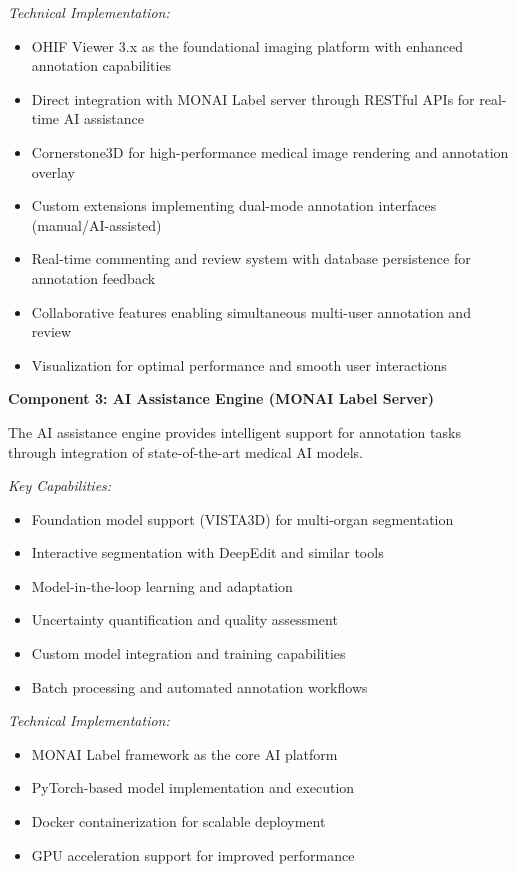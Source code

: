 \textit{Technical Implementation:}
\begin{itemize}
    \item OHIF Viewer 3.x as the foundational imaging platform with enhanced annotation capabilities
    \item Direct integration with MONAI Label server through RESTful APIs for real-time AI assistance
    \item Cornerstone3D for high-performance medical image rendering and annotation overlay
    \item Custom extensions implementing dual-mode annotation interfaces (manual/AI-assisted)
    \item Real-time commenting and review system with database persistence for annotation feedback
    \item Collaborative features enabling simultaneous multi-user annotation and review
    \item Visualization for optimal performance and smooth user interactions
\end{itemize}

\textbf{Component 3: AI Assistance Engine (MONAI Label Server)}

The AI assistance engine provides intelligent support for annotation tasks through integration of state-of-the-art medical AI models.

\textit{Key Capabilities:}
\begin{itemize}
    \item Foundation model support (VISTA3D) for multi-organ segmentation
    \item Interactive segmentation with DeepEdit and similar tools
    \item Model-in-the-loop learning and adaptation
    \item Uncertainty quantification and quality assessment
    \item Custom model integration and training capabilities
    \item Batch processing and automated annotation workflows
\end{itemize}

\textit{Technical Implementation:}
\begin{itemize}
    \item MONAI Label framework as the core AI platform
    \item PyTorch-based model implementation and execution
    \item Docker containerization for scalable deployment
    \item GPU acceleration support for improved performance
\end{itemize}

